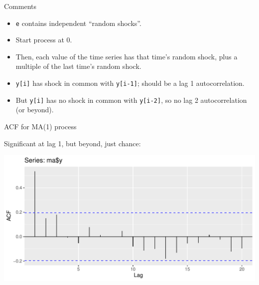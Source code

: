 \documentclass[ignorenonframetext,]{beamer}
\newenvironment{Shaded}{\begin{snugshade}}{\end{snugshade}}
\newcommand{\DataTypeTok}[1]{\textcolor[rgb]{0.13,0.29,0.53}{#1}}
\newcommand{\KeywordTok}[1]{\textcolor[rgb]{0.13,0.29,0.53}{\textbf{#1}}}
\newcommand{\NormalTok}[1]{#1}
\newcommand{\OperatorTok}[1]{\textcolor[rgb]{0.81,0.36,0.00}{\textbf{#1}}}
\newcommand{\StringTok}[1]{\textcolor[rgb]{0.31,0.60,0.02}{#1}}
\providecommand{\tightlist}{%
  \setlength{\itemsep}{0pt}\setlength{\parskip}{0pt}}
\begin{document}
\begin{frame}[fragile]{Comments}
\protect\hypertarget{comments-46}{}

\begin{itemize}
\tightlist
\item
  \texttt{e} contains independent ``random shocks''.
\item
  Start process at 0.
\item
  Then, each value of the time series has that time's random shock, plus
  a multiple of the last time's random shock.
\item
  \texttt{y{[}i{]}} has shock in common with \texttt{y{[}i-1{]}}; should
  be a lag 1 autocorrelation.
\item
  But \texttt{y{[}i{]}} has no shock in common with \texttt{y{[}i-2{]}},
  so no lag 2 autocorrelation (or beyond).
\end{itemize}

\end{frame}

\begin{frame}[fragile]{ACF for MA(1) process}
\protect\hypertarget{acf-for-ma1-process}{}

Significant at lag 1, but beyond, just chance:

\begin{Shaded}
\end{Shaded}

\includegraphics{figure/unnamed-chunk-550-1.pdf}

\end{frame}
\end{document}
